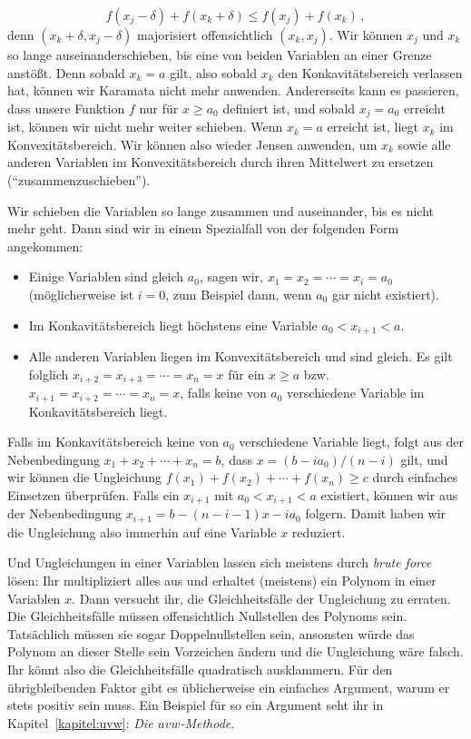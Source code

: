 \begin{equation*}
	f(x_j-\delta)+f(x_k+\delta)\leqslant f(x_j)+f(x_k)\,,
\end{equation*}
denn $(x_k+\delta,x_j-\delta)$ majorisiert offensichtlich $(x_k,x_j)$. Wir können $x_j$ und $x_k$ so lange auseinanderschieben, bis eine von beiden Variablen an einer Grenze \glqq anstößt\grqq. Denn sobald $x_k=a$ gilt, also sobald $x_k$ den Konkavitätsbereich verlassen hat, können wir Karamata nicht mehr anwenden. Andererseits kann es passieren, dass unsere Funktion $f$ nur für $x\geqslant a_0$ definiert ist, und sobald $x_j=a_0$ erreicht ist, können wir nicht mehr weiter schieben. Wenn $x_k=a$ erreicht ist, liegt $x_k$ im Konvexitätsbereich. Wir können also wieder Jensen anwenden, um $x_k$ sowie alle anderen Variablen im Konvexitätsbereich durch ihren Mittelwert zu ersetzen (\enquote{zusammenzuschieben}).

Wir schieben die Variablen so lange zusammen und auseinander, bis es nicht mehr geht. Dann sind wir in einem Spezialfall von der folgenden Form angekommen:
\begin{itemize}
	\item Einige Variablen sind gleich $a_0$, sagen wir, $x_1=x_2=\dotsb=x_i=a_0$ (möglicherweise ist $i=0$, zum Beispiel dann, wenn $a_0$ gar nicht existiert).
	\item Im Konkavitätsbereich liegt höchstens eine Variable $a_0<x_{i+1}<a$.
	\item Alle anderen Variablen liegen im Konvexitätsbereich und sind gleich. Es gilt folglich $x_{i+2}=x_{i+3}=\dotsb=x_n=x$ für ein $x\geqslant a$ bzw.\ $x_{i+1}=x_{i+2}=\dotsb=x_n=x$, falls keine von $a_0$ verschiedene Variable im Konkavitätsbereich liegt.
\end{itemize}
Falls im Konkavitätsbereich keine von $a_0$ verschiedene Variable liegt, folgt aus der Nebenbedingung $x_1+x_2+\dotsb+x_n=b$, dass $x=(b-ia_0)/(n-i)$ gilt, und wir können die Ungleichung $f(x_1)+f(x_2)+\dotsb+f(x_n)\geqslant c$ durch einfaches Einsetzen überprüfen. Falls ein $x_{i+1}$ mit $a_0<x_{i+1}<a$ existiert, können wir aus der Nebenbedingung $x_{i+1}=b-(n-i-1)x-ia_0$ folgern. Damit haben wir die Ungleichung also immerhin auf eine Variable $x$ reduziert.

Und Ungleichungen in einer Variablen lassen sich meistens durch \emph{brute force} lösen: Ihr multipliziert alles aus und erhaltet (meistens) ein Polynom in einer Variablen $x$. Dann versucht ihr, die Gleichheitsfälle der Ungleichung zu erraten. Die Gleichheitsfälle müssen offensichtlich Nullstellen des Polynoms sein. Tatsächlich müssen sie sogar Doppelnullstellen sein, ansonsten würde das Polynom an dieser Stelle sein Vorzeichen ändern und die Ungleichung wäre falsch. Ihr könnt also die Gleichheitsfälle quadratisch ausklammern. Für den übrigbleibenden Faktor gibt es üblicherweise ein einfaches Argument, warum er stets positiv sein muss. Ein Beispiel für so ein Argument seht ihr in Kapitel~\ref{kapitel:uvw}: \emph{Die $uvw$-Methode}.

